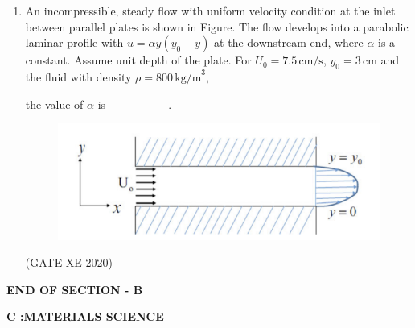 \documentclass[12pt]{article}
\begin{document}
\begin{enumerate}
(GATE XE 2020)  

\item An incompressible, steady flow with uniform velocity condition at the inlet between parallel plates is shown in Figure. The flow develops into a parabolic laminar profile with  
$
u = \alpha y (y_{0} - y)
$
at the downstream end, where $\alpha$ is a constant. Assume unit depth of the plate.  
For $U_{0} = 7.5 \,\text{cm/s}$, $y_{0} = 3 \,\text{cm}$ and the fluid with density $\rho = 800 \,\text{kg/m}^3$,  

the value of $\alpha$ is \_\_\_\_\_\_\_.  

\begin{figure}[H]
    \centering
    \includegraphics[width=0.5\columnwidth]{figs/ass4_b_q22.png}
    \caption{}
    \label{fig:placeholder}
\end{figure}

(GATE XE 2020)

\end{enumerate}

\begin{center}
    \textbf{END OF SECTION - B}
\end{center}

\newpage
\begin{center}
    {\Large \textbf{C :MATERIALS SCIENCE} }
\end{center}
\end{document}
